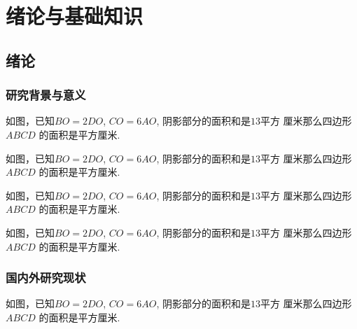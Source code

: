 \documentclass{USTBBook}
\begin{document}
\makeCover

\frontmatter
\pagestyle{fancy}

\setcounter{page}{0}
\cleardoublepage
{}

\tableofcontents

\mainmatter

\part{绪论与基础知识}

\chapter{绪论}
\zhlipsum[1]

\section{研究背景与意义}
\zhlipsum[2]

\begin{question}
  如图，已知$BO=2DO$, $CO=6AO$, 阴影部分的面积和是$13$平方
  厘米那么四边形 $ABCD$ 的面积是\fillin[]平方厘米.
\end{question}

\begin{question}
  如图，已知$BO=2DO$, $CO=6AO$, 阴影部分的面积和是$13$平方
  厘米那么四边形 $ABCD$ 的面积是\fillin[]平方厘米.
\end{question}

\begin{question}
  如图，已知$BO=2DO$, $CO=6AO$, 阴影部分的面积和是$13$平方
  厘米那么四边形 $ABCD$ 的面积是\fillin[]平方厘米.
\end{question}

\begin{question}
  如图，已知$BO=2DO$, $CO=6AO$, 阴影部分的面积和是$13$平方
  厘米那么四边形 $ABCD$ 的面积是\fillin[]平方厘米.
\end{question}

\zhlipsum[6-7]

\newpage
\section{国内外研究现状}

\begin{question*}
  如图，已知$BO=2DO$, $CO=6AO$, 阴影部分的面积和是$13$平方
  厘米那么四边形 $ABCD$ 的面积是\fillin[]平方厘米.
\end{question*}
\end{document}
